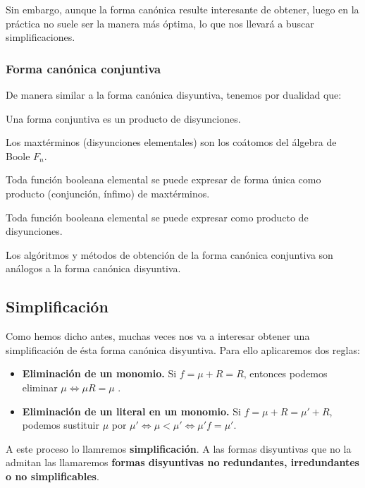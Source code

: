 Sin embargo, aunque la forma canónica resulte interesante de obtener, luego en la práctica no suele ser la manera más óptima, lo que nos llevará a buscar simplificaciones.

\subsubsection{Forma canónica conjuntiva}
De manera similar a la forma canónica disyuntiva, tenemos por dualidad que:
\begin{ndef}
    Una forma conjuntiva es un producto de disyunciones.
\end{ndef}
\begin{nth}
    Los maxtérminos (disyunciones elementales) son los coátomos del álgebra de Boole $F_n$.
\end{nth}
\begin{nth}
    Toda función booleana elemental se puede expresar de forma única como producto (conjunción, ínfimo) de maxtérminos.
\end{nth}
\begin{ncor}
    Toda función booleana elemental se puede expresar como producto de disyunciones.
\end{ncor}
\begin{nota}
    Los algóritmos y métodos de obtención de la forma canónica conjuntiva son análogos a la forma canónica disyuntiva.
\end{nota}

\subsection{Simplificación}
Como hemos dicho antes, muchas veces nos va a interesar obtener una simplificación de ésta forma canónica disyuntiva. Para ello aplicaremos dos reglas:
\begin{itemize}
    \item \textbf{Eliminación de un monomio.} Si $f = \mu + R = R$, entonces podemos eliminar $\mu \Longleftrightarrow \mu R = \mu$ .
    \item \textbf{Eliminación de un literal en un monomio.} Si $f = \mu + R = \mu ' + R$, podemos sustituir $\mu$ por $\mu ' \Longleftrightarrow \mu < \mu ' \Longleftrightarrow \mu ' f = \mu '$.
\end{itemize}
A este proceso lo llamremos \textbf{simplificación}. A las formas disyuntivas que no la admitan las llamaremos \textbf{formas disyuntivas no redundantes, irredundantes o no simplificables}.


